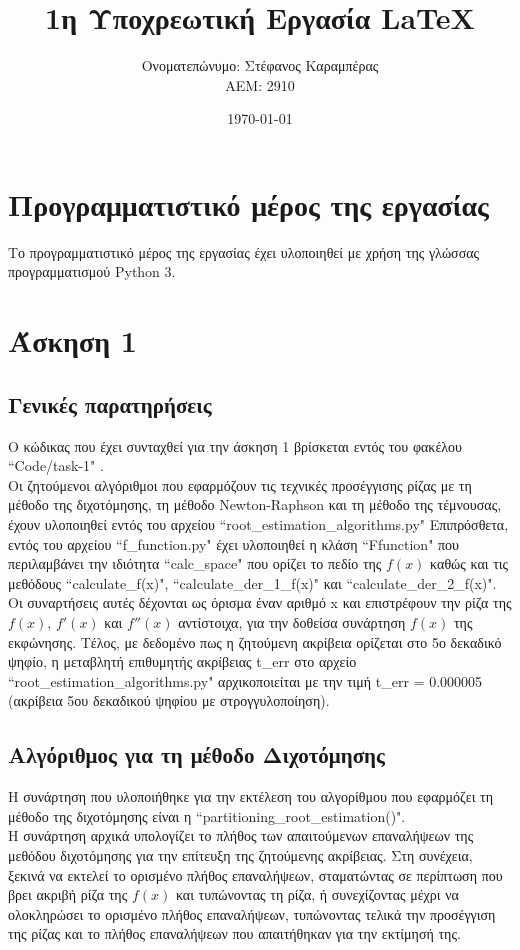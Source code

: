 \documentclass[a4paper,11pt]{article}
\title{1η Υποχρεωτική Εργασία \lt LaTeX} %
\author{Ονοματεπώνυμο: Στέφανος Καραμπέρας  \\  ΑΕΜ: 2910}       %
\date{\today}                                      %
\newcommand{\lt}{\latintext}
\begin{document}

\maketitle

\section*{Προγραμματιστικό μέρος της εργασίας}
Το προγραμματιστικό μέρος της εργασίας έχει υλοποιηθεί με χρήση της γλώσσας προγραμματισμού {\lt Python 3}.

\section*{Άσκηση 1}
\subsection*{Γενικές παρατηρήσεις}
Ο κώδικας που έχει συνταχθεί για την άσκηση 1 βρίσκεται εντός του φακέλου {\lt ``Code/task-1" }.\\
Οι ζητούμενοι αλγόριθμοι που εφαρμόζουν τις τεχνικές προσέγγισης ρίζας με τη μέθοδο της διχοτόμησης, τη μέθοδο {\lt Newton-Raphson} και τη μέθοδο της τέμνουσας, έχουν υλοποιηθεί
εντός του αρχείου {\lt ``root\_estimation\_algorithms.py"}
Επιπρόσθετα, εντός του αρχείου {\lt ``f\_function.py"} έχει υλοποιηθεί η κλάση {\lt ``Ffunction"} που περιλαμβάνει την ιδιότητα {\lt ``calc\_space"} που ορίζει το πεδίο της {\lt $f(x)$} καθώς και τις μεθόδους {\lt ``calculate\_f(x)"}, {\lt ``calculate\_der\_1\_f(x)"} και {\lt ``calculate\_der\_2\_f(x)"}. Οι συναρτήσεις αυτές δέχονται ως όρισμα έναν αριθμό {\lt x} και επιστρέφουν την ρίζα της {\lt $f(x)$}, {\lt $f'(x)$} και {\lt $f''(x)$} αντίστοιχα,  για την δοθείσα συνάρτηση {\lt $f(x)$} της εκφώνησης. Τέλος, με δεδομένο πως η ζητούμενη ακρίβεια ορίζεται στο 5ο δεκαδικό ψηφίο, η μεταβλητή επιθυμητής ακρίβειας {\lt t\_err}  στο αρχείο {\lt ``root\_estimation\_algorithms.py"} αρχικοποιείται με την τιμή {\lt t\_err} = 0.000005 (ακρίβεια 5ου δεκαδικού ψηφίου με στρογγυλοποίηση).
\subsection*{Αλγόριθμος για τη μέθοδο Διχοτόμησης}
Η συνάρτηση που υλοποιήθηκε για την εκτέλεση του αλγορίθμου που εφαρμόζει τη μέθοδο της διχοτόμησης είναι η {\lt ``partitioning\_root\_estimation()"}. \\
Η συνάρτηση αρχικά υπολογίζει το πλήθος των απαιτούμενων επαναλήψεων της μεθόδου διχοτόμησης για την επίτευξη της ζητούμενης ακρίβειας. Στη συνέχεια, ξεκινά να εκτελεί το ορισμένο πλήθος επαναλήψεων, 			σταματώντας σε περίπτωση που βρει ακριβή ρίζα της {\lt$f(x)$} και τυπώνοντας τη ρίζα, ή συνεχίζοντας μέχρι να ολοκληρώσει το ορισμένο πλήθος επαναλήψεων, τυπώνοντας τελικά την προσέγγιση της ρίζας και το 		πλήθος επαναλήψεων που απαιτήθηκαν για την εκτίμησή της.\\
\end{document}
